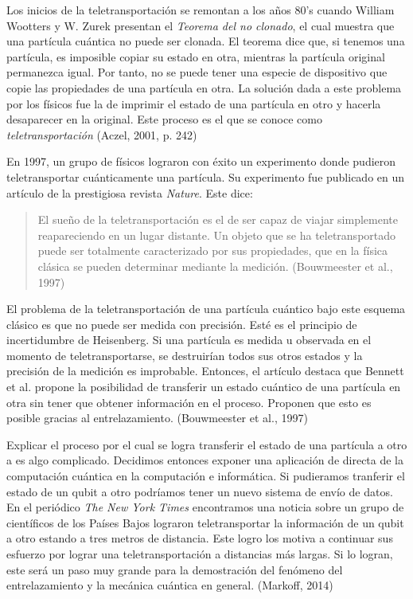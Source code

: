 \documentclass[11pt,a4paper]{article}
\begin{document}
Los inicios de la teletransportación se remontan a los años 80's cuando William Wootters y W. Zurek presentan el \textit{Teorema del no clonado}, el cual muestra que una partícula cuántica no puede ser clonada. El teorema dice que, si tenemos una partícula, es imposible copiar su estado en otra, mientras la partícula original permanezca igual.  Por tanto, no se puede tener una especie de dispositivo que copie las propiedades de una partícula en otra. La solución dada a este problema por los físicos fue la de imprimir el estado de una partícula en otro y hacerla desaparecer en la original. Este proceso es el que se conoce como \textit{teletransportación}  (Aczel, 2001, p. 242)

En 1997, un grupo de físicos lograron con éxito un experimento donde pudieron teletransportar cuánticamente una partícula. Su experimento fue publicado en un artículo de la prestigiosa revista \textit{Nature}. Este dice:
\begin{quote}
El sueño de la teletransportación es el de ser capaz de viajar simplemente reapareciendo en un lugar distante. Un objeto que se ha teletransportado puede ser totalmente caracterizado por sus propiedades, que en la física clásica se pueden determinar mediante la medición. (Bouwmeester et al., 1997)
\end{quote}

El problema de la teletransportación de una partícula cuántico bajo este esquema clásico es que no puede ser medida con precisión. Esté es el principio de incertidumbre de Heisenberg. Si una partícula es medida u observada en el momento de teletransportarse, se destruirían todos sus otros estados y la precisión de la medición es improbable. Entonces, el artículo destaca que Bennett et al. propone la posibilidad de transferir un estado cuántico de una partícula en otra sin tener que obtener información en el proceso. Proponen que esto es posible gracias al entrelazamiento. (Bouwmeester et al., 1997)

Explicar el proceso por el cual se logra transferir el estado de una partícula a otro a es algo complicado. Decidimos entonces exponer una aplicación de directa de la computación cuántica en la computación e informática. Si pudieramos tranferir el estado de un qubit a otro podríamos tener un nuevo sistema de envío de datos. En el periódico \textit{The New York Times} encontramos una noticia sobre un grupo de científicos de los Países Bajos lograron teletransportar la información de un qubit a otro estando a tres metros de distancia. Este logro los motiva a continuar sus esfuerzo por lograr una teletransportación a distancias más largas. Si lo logran, este será un paso muy grande para la demostración del fenómeno del entrelazamiento y la mecánica cuántica en general. (Markoff, 2014)
\clearpage
\end{document}

